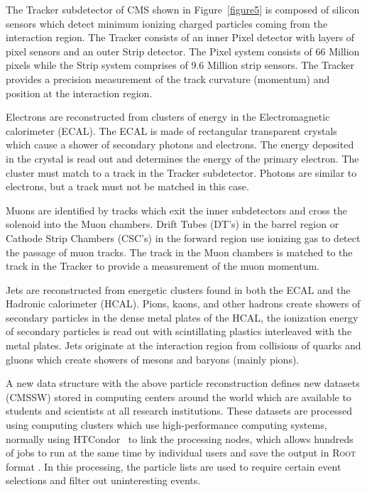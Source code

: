 \documentclass[final,3p]{CSP}
\begin{document}
The Tracker subdetector of CMS shown in Figure~\ref{figure5} is composed of silicon sensors which detect minimum ionizing charged particles coming from the interaction region. The Tracker consists of an inner Pixel detector with layers of pixel sensors and an outer Strip detector. The Pixel system consists of 66 Million pixels while the Strip system comprises of 9.6 Million strip sensors. The Tracker provides a precision measurement of the track curvature (momentum) and position at the interaction region.

Electrons are reconstructed from clusters of energy in the Electromagnetic calorimeter (ECAL). The ECAL is made of rectangular transparent crystals which cause a shower of secondary photons and electrons. The energy deposited in the crystal is read out and determines the energy of the primary electron. The cluster must match to a track in the Tracker subdetector. Photons are similar to electrons, but a track must not be matched in this case.

Muons are identified by tracks which exit the inner subdetectors and cross the solenoid into the Muon chambers. Drift Tubes (DT's) in the barrel region or Cathode Strip Chambers (CSC's) in the forward region use ionizing gas to detect the passage of muon tracks.  The track in the Muon chambers is matched to the track in the Tracker to provide a measurement of the muon momentum.

Jets are reconstructed from energetic clusters found in both the ECAL and the Hadronic calorimeter (HCAL).
Pions, kaons, and other hadrons create showers of secondary particles in the dense metal plates of the HCAL, the ionization energy of secondary particles is read out with scintillating plastics interleaved with the metal plates.  
Jets originate at the interaction region from collisions of quarks and gluons which create showers of mesons and baryons (mainly pions).


A new data structure with the above particle reconstruction defines new  datasets (\textsc{CMSSW}) stored in computing centers around the world which are available to students and scientists at all research institutions.
These  datasets are processed using computing clusters which use high-performance computing systems, normally using HTCondor~\cite{HTCondor} to link the processing nodes, which allows hundreds of jobs to run at the same time by individual users and save the output in \textsc{Root} format \cite{brun2003root}.
In this processing, the particle lists are used to require certain event selections and filter out uninteresting events.
\end{document}

